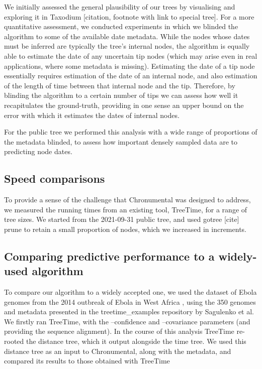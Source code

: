 We initially assessed the general plausibility of our trees by visualising and exploring it in Taxodium [citation, footnote with link to special tree]. For a more quantitative assessment, we conducted experiments in which we blinded the algorithm to some of the available date metadata. While the nodes whose dates must be inferred are typically the tree's internal nodes, the algorithm is equally able to estimate the date of any uncertain tip nodes (which may arise even in real applications, where some metadata is missing). Estimating the date of a tip node essentially requires estimation of the date of an internal node, and also estimation of the length of time between that internal node and the tip. Therefore, by blinding the algorithm to a certain number of tips we can assess how well it recapitulates the ground-truth, providing in one sense an upper bound on the error with which it estimates the dates of internal nodes.

For the public tree we performed this analysis with a wide range of proportions of the metadata blinded, to assess how important densely sampled data are to predicting node dates.

\subsection*{Speed comparisons}
To provide a sense of the challenge that Chronumental was designed to address, we measured the running times from an existing tool, TreeTime, for a range of tree sizes. We started from the 2021-09-31 public tree, and used gotree [cite] prune to retain a small proportion of nodes, which we increased in increments. 


\subsection*{Comparing predictive performance to a widely-used algorithm}

To compare our algorithm  to a widely accepted one, we used the dataset of Ebola genomes from the 2014 outbreak of Ebola in West Africa  \cite{Dudas2017-km}, using the 350 genomes and metadata presented in the treetime\_examples repository by Sagulenko et al. We firstly ran TreeTime, with the --confidence and --covariance parameters (and providing the sequence alignment). In the course of this analysis TreeTime re-rooted the distance tree, which it output alongside the time tree. We used this distance tree as an input to Chronumental, along with the metadata, and compared its results to those obtained with TreeTime


